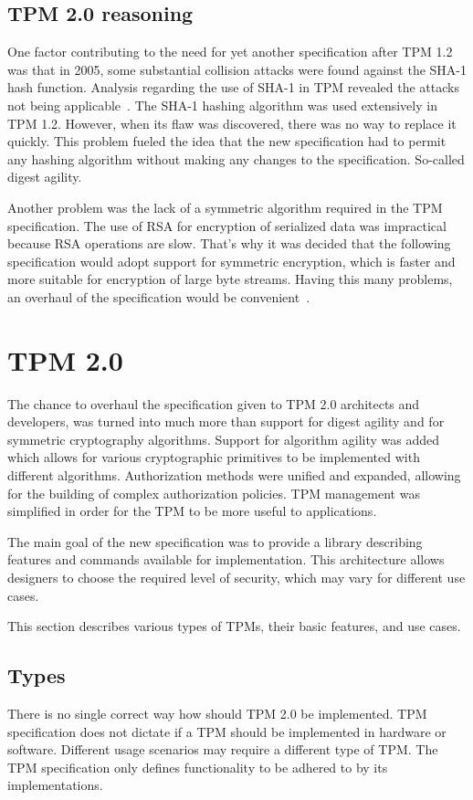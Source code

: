 \subsection{TPM 2.0 reasoning}
One factor contributing to the need for yet another specification after TPM 1.2 was that in 2005, some substantial collision attacks were found against the SHA-1 hash function. Analysis regarding the use of SHA-1 in TPM revealed the attacks not being applicable~\cite{tcg_tpm1.12_sha-1_uses}. The SHA-1 hashing algorithm was used extensively in TPM 1.2. However, when its flaw was discovered, there was no way to replace it quickly. This problem fueled the idea that the new specification had to permit any hashing algorithm without making any changes to the specification. So-called digest agility. 

Another problem was the lack of a symmetric algorithm required in the TPM specification. The use of RSA for encryption of serialized data was impractical because RSA operations are slow. That's why it was decided that the following specification would adopt support for symmetric encryption, which is faster and more suitable for encryption of large byte streams. Having this many problems, an overhaul of the specification would be convenient~\cite[p.~4]{arthur2015practical}.



\section{TPM 2.0}\label{sec:tpm2}
The chance to overhaul the specification given to TPM 2.0 architects and developers, was turned into much more than support for digest agility and for symmetric cryptography algorithms. Support for algorithm agility was added which allows for various cryptographic primitives to be implemented with different algorithms. Authorization methods were unified and expanded, allowing for the building of complex authorization policies. TPM management was simplified in order for the TPM to be more useful to applications.

The main goal of the new specification was to provide a library describing features and commands available for implementation. This architecture allows designers to choose the required level of security, which may vary for different use cases. 

This section describes various types of TPMs, their basic features, and use cases.

\subsection{Types}
There is no single correct way how should TPM 2.0 be implemented. TPM specification does not dictate if a TPM should be implemented in hardware or software. Different usage scenarios may require a different type of TPM. The TPM specification only defines functionality to be adhered to by its implementations. 

